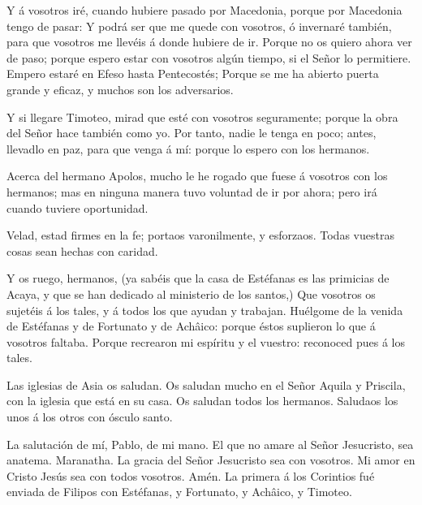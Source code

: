  Y á vosotros iré, cuando hubiere pasado por Macedonia,
porque por Macedonia tengo de pasar:  Y podrá ser que me
quede con vosotros, ó invernaré también, para que vosotros me llevéis á
donde hubiere de ir.  Porque no os quiero ahora ver de paso;
porque espero estar con vosotros algún tiempo, si el Señor lo
permitiere.  Empero estaré en Efeso hasta Pentecostés;
 Porque se me ha abierto puerta grande y eficaz, y muchos
son los adversarios.

 Y si llegare Timoteo, mirad que esté con vosotros
seguramente; porque la obra del Señor hace también como yo.
 Por tanto, nadie le tenga en poco; antes, llevadlo en paz,
para que venga á mí: porque lo espero con los hermanos.

 Acerca del hermano Apolos, mucho le he rogado que fuese á
vosotros con los hermanos; mas en ninguna manera tuvo voluntad de ir por
ahora; pero irá cuando tuviere oportunidad.

 Velad, estad firmes en la fe; portaos varonilmente, y
esforzaos.  Todas vuestras cosas sean hechas con caridad.

 Y os ruego, hermanos, (ya sabéis que la casa de Estéfanas
es las primicias de Acaya, y que se han dedicado al ministerio de los
santos,)  Que vosotros os sujetéis á los tales, y á todos
los que ayudan y trabajan.  Huélgome de la venida de
Estéfanas y de Fortunato y de Achâico: porque éstos suplieron lo que á
vosotros faltaba.  Porque recrearon mi espíritu y el
vuestro: reconoced pues á los tales.

 Las iglesias de Asia os saludan. Os saludan mucho en el
Señor Aquila y Priscila, con la iglesia que está en su casa.
 Os saludan todos los hermanos. Saludaos los unos á los
otros con ósculo santo.

 La salutación de mí, Pablo, de mi mano.  El
que no amare al Señor Jesucristo, sea anatema. Maranatha. 
La gracia del Señor Jesucristo sea con vosotros.  Mi amor
en Cristo Jesús sea con todos vosotros. Amén. La primera á los Corintios
fué enviada de Filipos con Estéfanas, y Fortunato, y Achâico, y Timoteo.
